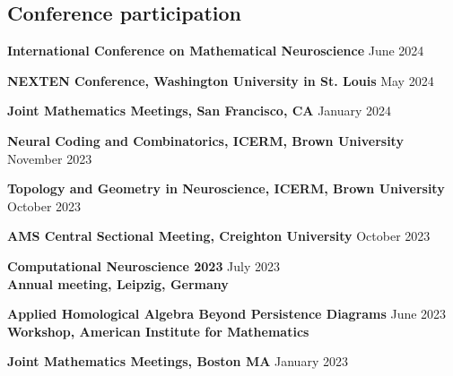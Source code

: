 \documentclass[10pt,letterpaper]{article}
\renewenvironment{itemize}{
  \begin{list}{}{
    \setlength{\leftmargin}{1.5em}
    \setlength{\itemsep}{0.25em}
    \setlength{\parskip}{0pt}
    \setlength{\parsep}{0.25em}
  }
}{
  \end{list}
}
\begin{document}
\subsection*{Conference participation}
\begin{itemize}

	\item{\bf International Conference on Mathematical Neuroscience} \hfill June 2024
	
	\item{\bf NEXTEN Conference, Washington University in St. Louis} \hfill May 2024

	{\item {\bf Joint Mathematics Meetings, San Francisco, CA} \hfill January 2024}
	
	{\item {\bf Neural Coding and Combinatorics, ICERM, Brown University} \hfill November 2023}
	
	{\item {\bf Topology and Geometry in Neuroscience, ICERM, Brown University} \hfill October 2023}
	
	{\item {\bf AMS Central Sectional Meeting, Creighton University} \hfill October 2023}

	\item {\bf Computational Neuroscience 2023} \hfill July 2023\\
	{\bf Annual meeting, Leipzig, Germany}


	\item {\bf Applied Homological Algebra Beyond Persistence Diagrams} \hfill June 2023\\
	{\bf Workshop, American Institute for Mathematics}
	
	{\item {\bf Joint Mathematics Meetings, Boston MA} \hfill January 2023}
	

\end{itemize}
\end{document}
